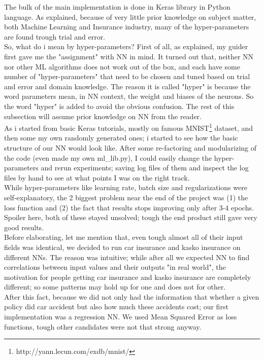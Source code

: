\documentclass[titlepage, a4paper, 14pt]{extarticle} %
\begin{document}
The bulk of the main implementation is done in Keras library in Python language. As explained, because of very little prior knowledge on subject matter, both Machine Learning and Insurance industry, many of the hyper-parameters are found trough trial and error. \\

So, what do i mean by hyper-parameters? First of all, as explained, my guider first gave me the "assignment" with NN in mind. It turned out that, neither NN nor other ML algorithms does not work out of the box, and each have some number of "hyper-parameters" that need to be chosen and tuned based on trial and error and domain knowledge. The reason it is called "hyper" is because the word parameters mean, in NN context, the weight and biases of the neurons. So the word "hyper" is added to avoid the obvious confusion. The rest of this subsection will assume prior knowledge on NN from the reader. \\

As i started from basic Keras tutorials, mostly on famous MNIST\footnote{http://yann.lecun.com/exdb/mnist/} dataset, and then some my own randomly generated ones; i started to see how the basic structure of our NN would look like. After some re-factoring and modularizing of the code (even made my own ml\_lib.py), I could easily change the hyper-parameters and rerun experiments; saving log files of them and inspect the log files by hand to see at what points I was on the right track. \\

While hyper-parameters like learning rate, batch size and regularizations were self-explanatory, the 2 biggest problem near the end of the project was (1) the loss function and (2) the fact that results stops improving only after 3-4 epochs. Spoiler here, both of these stayed unsolved; tough the end product still gave very good results.\\

Before elaborating, let me mention that, even tough almost all of their input fields was identical, we decided to run car insurance and kasko insurance on different NNs. The reason was intuitive; while after all we expected NN to find correlations between input values and their outputs "in real world", the motivation for people getting car insurance and kasko insurance are completely different; so some patterns may hold up for one and does not for other. \\ 

After this fact, because we did not only had the information that whether a given policy did car accident but also how much these accidents cost; our first implementation was a regression NN. We used Mean Squared Error as loss functions, tough other candidates were not that strong anyway. \\ 
\end{document}
